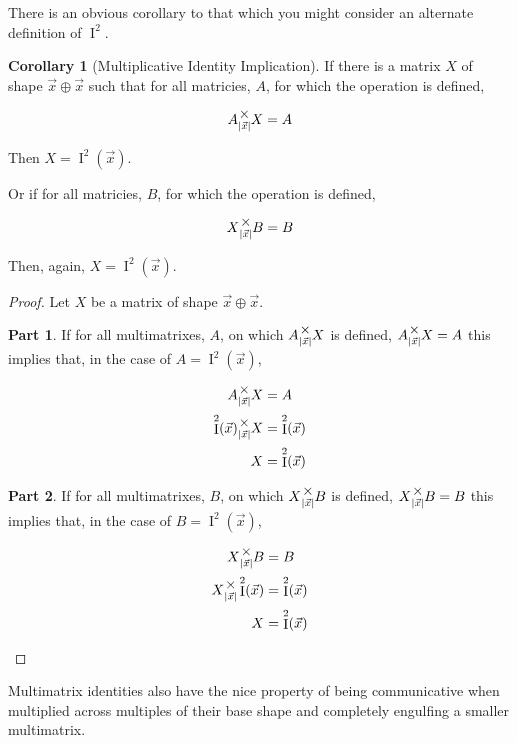 \documentclass[12pt]{book}
\theoremstyle{plain}
\theoremstyle{definition}
\newtheorem{corollary}{Corollary}[theorem]
\theoremstyle{ppart}
\newtheorem{ppart}{Part}
\theoremstyle{case}
\theoremstyle{solution}
\DeclareMathOperator{\Ident}{I}
\newcommand{\mmult}[1]{\text{\raisebox{1ex}{$\underset{#1}{\times}$}}}
\newcommand{\shape}[1]{\left|#1\right|}
\begin{document}
There is an obvious corollary to that which you might consider an
alternate definition of $\Ident^2$.

\begin{corollary}[Multiplicative Identity Implication]
\label{mm_ident_imp}
If there is a matrix $X$ of shape $\vec{x} \oplus \vec{x}$ such that
for all matricies, $A$, for which the operation is defined,

\[A \mmult{\shape{\vec{x}}} X = A \]

Then $X = \Ident^2(\vec{x})$.

Or if for all matricies, $B$, for which the operation is defined,

\[X \mmult{\shape{\vec{x}}} B = B \]

Then, again, $X = \Ident^2(\vec{x})$.
\end{corollary}
\begin{proof}
Let $X$ be a matrix of shape $\vec{x} \oplus \vec{x}$. 
\begin{ppart}
If for all multimatrixes, $A$, on which $A \mmult{\shape{\vec{x}}} X$ is defined, 
$A \mmult{\shape{\vec{x}}} X = A$ this implies that, in the case of $A = \Ident^2(\vec{x})$,

\begin{align*}
  A \mmult{\shape{\vec{x}}} X &= A \\
 \Ident^2(\vec{x}) \mmult{\shape{\vec{x}}} X &= \Ident^2(\vec{x}) \\
  X &= \Ident^2(\vec{x}) 
\end{align*}
\end{ppart}
\begin{ppart}
If for all multimatrixes, $B$, on which $X \mmult{\shape{\vec{x}}} B$ is defined, 
$X \mmult{\shape{\vec{x}}} B = B$ this implies that, in the case of $B = \Ident^2(\vec{x})$,

\begin{align*}
  X \mmult{\shape{\vec{x}}} B &= B \\
  X \mmult{\shape{\vec{x}}} \Ident^2(\vec{x}) &= \Ident^2(\vec{x}) \\
  X &= \Ident^2(\vec{x}) 
\end{align*}
\end{ppart}
\end{proof}

Multimatrix identities also have the nice property of being communicative when multiplied
across multiples of their base shape and completely engulfing a smaller multimatrix.
\end{document}
